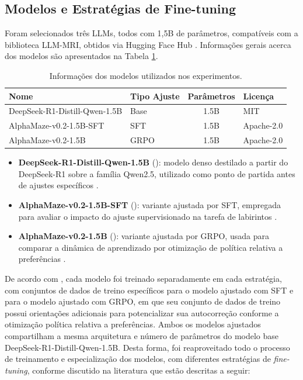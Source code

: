 \subsection{Modelos e Estratégias de Fine-tuning}

Foram selecionados três LLMs, todos com 1,5B de parâmetros, compatíveis com a biblioteca LLM-MRI, obtidos via Hugging Face Hub \cite{hf-hugging-face-hub-2025}. Informações gerais acerca dos modelos são apresentados na Tabela \ref{tab:modelos-utilizados}.
\begin{table}[h]
    \centering
    \caption{Informações dos modelos utilizados nos experimentos.}
    \label{tab:modelos-utilizados}
    \begin{tabular}{|l|l|c|l|}
        \hline
        Nome & Tipo Ajuste & Parâmetros & Licença \\
        \hline
        DeepSeek-R1-Distill-Qwen-1.5B & Base & 1.5B & MIT \\
        AlphaMaze-v0.2-1.5B-SFT & SFT & 1.5B & Apache-2.0 \\
        AlphaMaze-v0.2-1.5B & GRPO & 1.5B & Apache-2.0 \\
        \hline
    \end{tabular}
\end{table}

\begin{itemize}
    \item \textbf{DeepSeek-R1-Distill-Qwen-1.5B} (\cite{hf-deepseek-r1-dq-1p5b}): modelo denso destilado a partir do DeepSeek-R1 sobre a família Qwen2.5, utilizado como ponto de partida antes de ajustes específicos \cite{hf-deepseek-r1-dq-1p5b}.
    \item \textbf{AlphaMaze-v0.2-1.5B-SFT} (\cite{hf-jan-alpha-sft-1p5b}): variante ajustada por SFT, empregada para avaliar o impacto do ajuste supervisionado na tarefa de labirintos \cite{hf-jan-alpha-sft-1p5b}.
    \item \textbf{AlphaMaze-v0.2-1.5B} (\cite{hf-menlo-alphamaze-v02-1p5b}): variante ajustada por GRPO, usada para comparar a dinâmica de aprendizado por otimização de política relativa a preferências \cite{hf-menlo-alphamaze-v02-1p5b, dao2025alphamaze}.
\end{itemize}

De acordo com \cite{dao2025alphamaze}, cada modelo foi treinado separadamente em cada estratégia, com conjuntos de dados de treino específicos para o modelo ajustado com SFT e para o modelo ajustado com GRPO, em que seu conjunto de dados de treino possui orientações adicionais para potencializar sua autocorreção conforme a otimização política relativa a preferências. Ambos os modelos ajustados compartilham a mesma arquitetura e número de parâmetros do modelo base DeepSeek-R1-Distill-Qwen-1.5B. Desta forma, foi reaproveitado todo o processo de treinamento e especialização dos modelos, com diferentes estratégias de \textit{fine-tuning}, conforme discutido na literatura que estão descritas a seguir:

